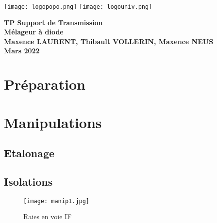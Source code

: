 \documentclass[oneside,a4paper,12pt]{article}
\begin{document}
	\begin{titlepage}
		\texttt{[image: logopopo.png]}
		\hspace*{\fill}
		\texttt{[image: logouniv.png]}
		
		\begin{center}
			\vspace{1cm}
			\textbf{TP Support de Transmission}\\
			\textbf{Mélageur à diode}\\
			\vspace{1cm}
			\textbf{Maxence LAURENT, Thibault VOLLERIN, Maxence NEUS}\\
			\vspace{3cm}
			\vspace{\fill}
			\textbf{Mars 2022}\\
		\end{center}
	\end{titlepage}
	
	\tableofcontents
	
	\vspace{5cm}
	
	\begin{abstract}
	
 	\end{abstract}

	\newpage

	\section{Préparation}
	
	\newpage

	\section{Manipulations}

	\subsection{Etalonage}


	
	\subsection{Isolations}

	\begin{figure}[h]
		\centering
		\texttt{[image: manip1.jpg]}	
		\caption{Raies en voie IF}
	\end{figure}
\end{document}
